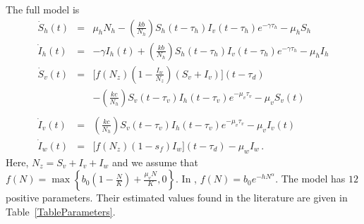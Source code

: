 \documentclass[12pt,leqno]{article}
\begin{document}
The full model is
\begin{eqnarray}\label{model}
\dot{S}_h(t) &=&  \mu_hN_h - \left(\frac{k b}{N_h}\right) S_h(t-\tau_h)  I_v(t-\tau_h)e^{-\gamma\tau_h} - \mu_hS_h\nonumber\\
\dot{I}_h(t) &=& -\gamma I_h(t) + \left(\frac{k b}{N_h}\right)S_h(t-\tau_h)I_v(t-\tau_h)e^{-\gamma\tau_h} - \mu_h I_h\nonumber\\
\dot{S}_v(t) &=& \Big[f(N_z)\left(1 - \frac{I_w}{N_z}\right)(S_v+I_v)\Big](t-\tau_d)\nonumber \\
& & - \left(\frac{k c}{N_h}\right) S_v(t-\tau_v)I_h(t-\tau_v)e^{-\mu_v\tau_v} - \mu_v S_v(t)\label{modelux}\\\nonumber \\
\dot{I}_v(t) &=& \left(\frac{k c}{N_h}\right)S_v(t-\tau_v)I_h(t-\tau_v)e^{-\mu_v\tau_v} - \mu_v I_v(t)\nonumber\\
\dot{I}_w(t) &=& \big[f(N_z)(1-s_f)I_w\big](t-\tau_d) - \mu_w I_w\nonumber\,. 
\end{eqnarray} 
Here, $N_z = S_v + I_v + I_w$ and we assume that 
$f(N) = \max\left\{b_0\left(1-\displaystyle\frac{N}{K}\right)+\displaystyle\frac{\mu_v N}{K},0\right\}$. In \citep{Hughes2013}, $f(N) = b_0e^{-hN^{\alpha}}$. The model has $12$ positive parameters. Their estimated values found in the literature are given in Table~\ref{TableParameters}.\smallskip
\end{document}

